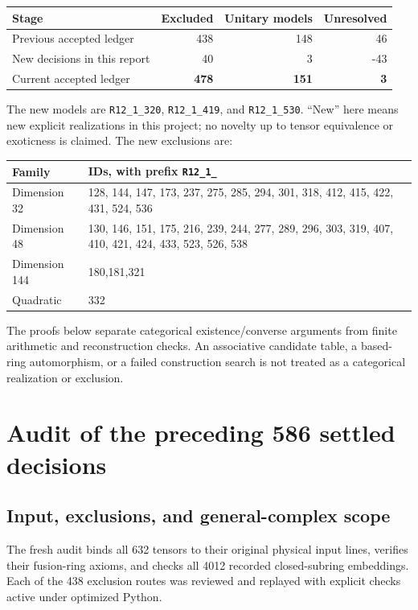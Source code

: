 \documentclass[11pt]{article}
\newcommand{\R}[1]{\texttt{R12\_1\_#1}}
\begin{document}
\begin{center}
\begin{tabular}{lrrr}\toprule
Stage & Excluded & Unitary models & Unresolved\\\midrule
Previous accepted ledger & 438&148&46\\
New decisions in this report &40&3&-43\\
Current accepted ledger &\textbf{478}&\textbf{151}&\textbf{3}\\\bottomrule
\end{tabular}
\end{center}
The new models are \R{320}, \R{419}, and \R{530}. ``New'' here means new
explicit realizations in this project; no novelty up to tensor equivalence
or exoticness is claimed. The new exclusions are:
\begin{center}\begin{tabular}{lp{126mm}}\toprule
Family & IDs, with prefix \texttt{R12\_1\_}\\\midrule
Dimension 32 &128, 144, 147, 173, 237, 275, 285, 294, 301, 318, 412, 415, 422, 431, 524, 536\\
Dimension 48 &130, 146, 151, 175, 216, 239, 244, 277, 289, 296, 303, 319, 407, 410, 421, 424, 433, 523, 526, 538\\
Dimension 144 &180,181,321\\
Quadratic &332\\\bottomrule\end{tabular}\end{center}

The proofs below separate categorical existence/converse arguments from
finite arithmetic and reconstruction checks. An associative candidate
table, a based-ring automorphism, or a failed construction search is not
treated as a categorical realization or exclusion.

\section{Audit of the preceding 586 settled decisions}
\subsection{Input, exclusions, and general-complex scope}
The fresh audit binds all 632 tensors to their original physical input
lines, verifies their fusion-ring axioms, and checks all 4012 recorded
closed-subring embeddings. Each of the 438 exclusion routes was reviewed
and replayed with explicit checks active under optimized Python.
\end{document}
